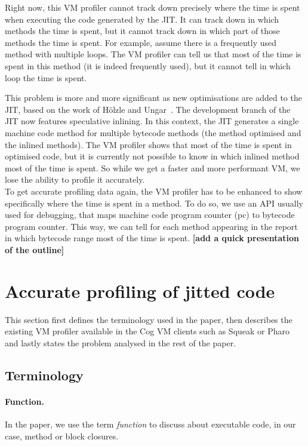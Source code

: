 \documentclass[10pt,preprint]{sigplanconf}
\begin{document}
Right now, this VM profiler cannot track down precisely where the time is spent when executing the code generated by the JIT. It can track down in which methods the time is spent, but it cannot track down in which part of those methods the time is spent. For example, assume there is a frequently used method with multiple loops. The VM profiler can tell us that most of the time is spent in this method (it is indeed frequently used), but it cannot tell in which loop the time is spent.

This problem is more and more significant as new optimisations are added to the JIT, based on the work of H\"olzle and Ungar~\cite{Holz94a}. The development branch of the JIT now features speculative inlining. In this context, the JIT generates a single machine code method for multiple bytecode methods (the method optimised and the inlined methods). The VM profiler shows that most of the time is spent in optimised code, but it is currently not possible to know in which inlined method most of the time is spent. So while we get a faster and more performant VM, we lose the ability to profile it accurately.\\

To get accurate profiling data again, the VM profiler has to be enhanced to show specifically where the time is spent in a method. To do so, we use an API usually used for debugging, that maps machine code program counter (pc) to bytecode program counter. This way, we can tell for each method appearing in the report in which bytecode range most of the time is spent.
\textbf{[add a quick presentation of the outline]}



\section{Accurate profiling of jitted code}

This section first defines the terminology used in the paper, then describes the existing VM profiler available in the Cog VM clients such as Squeak or Pharo and lastly states the problem analysed in the rest of the paper.

\subsection{Terminology}

\paragraph{Function.} In the paper, we use the term \emph{function} to discuss about executable code, in our case, method or block closures.
\end{document}
